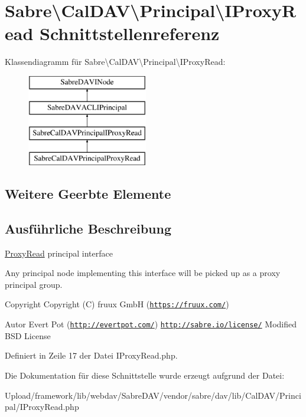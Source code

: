 \hypertarget{interface_sabre_1_1_cal_d_a_v_1_1_principal_1_1_i_proxy_read}{}\section{Sabre\textbackslash{}Cal\+D\+AV\textbackslash{}Principal\textbackslash{}I\+Proxy\+Read Schnittstellenreferenz}
\label{interface_sabre_1_1_cal_d_a_v_1_1_principal_1_1_i_proxy_read}
Klassendiagramm für Sabre\textbackslash{}Cal\+D\+AV\textbackslash{}Principal\textbackslash{}I\+Proxy\+Read\+:\begin{figure}[H]
\begin{center}
\leavevmode
\includegraphics[height=4.000000cm]{interface_sabre_1_1_cal_d_a_v_1_1_principal_1_1_i_proxy_read}
\end{center}
\end{figure}
\subsection*{Weitere Geerbte Elemente}


\subsection{Ausführliche Beschreibung}
\mbox{\hyperlink{class_sabre_1_1_cal_d_a_v_1_1_principal_1_1_proxy_read}{Proxy\+Read}} principal interface

Any principal node implementing this interface will be picked up as a \textquotesingle{}proxy principal group\textquotesingle{}.

\begin{DoxyCopyright}{Copyright}
Copyright (C) fruux GmbH (\href{https://fruux.com/}{\tt https\+://fruux.\+com/}) 
\end{DoxyCopyright}
\begin{DoxyAuthor}{Autor}
Evert Pot (\href{http://evertpot.com/}{\tt http\+://evertpot.\+com/})  \href{http://sabre.io/license/}{\tt http\+://sabre.\+io/license/} Modified B\+SD License 
\end{DoxyAuthor}


Definiert in Zeile 17 der Datei I\+Proxy\+Read.\+php.



Die Dokumentation für diese Schnittstelle wurde erzeugt aufgrund der Datei\+:\begin{DoxyCompactItemize}
\item 
Upload/framework/lib/webdav/\+Sabre\+D\+A\+V/vendor/sabre/dav/lib/\+Cal\+D\+A\+V/\+Principal/I\+Proxy\+Read.\+php\end{DoxyCompactItemize}
